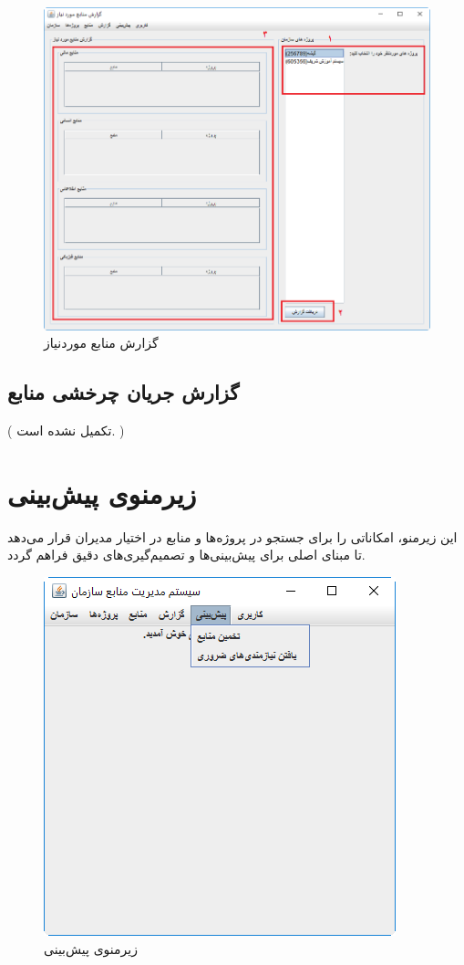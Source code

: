 	\begin{figure}[H]
		\centering
		\includegraphics[scale=0.5]{img/manual/reqRep}
		\caption{گزارش منابع موردنیاز}
	\end{figure}
	


\subsection{گزارش جریان چرخشی منابع }
({\color{red} تکمیل نشده است. })

\newpage
\section{زیرمنوی پیش‌بینی}
این زیرمنو، امکاناتی را برای جستجو در پروژه‌ها و منابع در اختیار مدیران قرار می‌دهد تا مبنای اصلی برای پیش‌بینی‌ها و تصمیم‌گیری‌های دقیق فراهم گردد.
	\begin{figure}[H]
		\centering
		\includegraphics[scale=0.7]{img/manual/estSubmenu}
		\caption{زیرمنوی پیش‌بینی}
	\end{figure}

